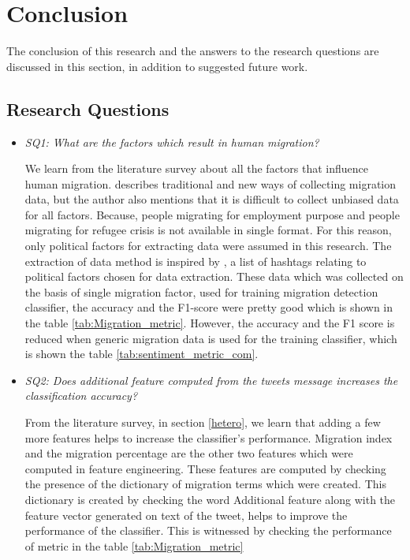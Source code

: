 \chapter{Conclusion}\label{chap:conclusion}

The conclusion of this research and the answers to the research questions are discussed in this section, in addition to suggested future work.

\section{Research Questions}


\begin{itemize}
    \item \textit{SQ1: What are the factors which result in human migration?}
    
    We learn from the literature survey about all the factors that influence human migration. \cite{Christina_Hughes_et_al.} describes traditional and new ways of collecting migration data, but the author also mentions that it is difficult to collect unbiased data for all factors. Because, people migrating for employment purpose and people migrating for refugee crisis is not available in single format. For this reason, only political factors for extracting data were assumed in this research. The extraction of data method is inspired by \cite{Cortis}, a list of hashtags relating to political factors chosen for data extraction. These data which was collected on the basis of single migration factor, used for training migration detection classifier, the accuracy and the F1-score were pretty good which is shown in the table \ref{tab:Migration_metric}. However, the accuracy and the F1 score is reduced when generic migration data is used for the training classifier, which is shown the table \ref{tab:sentiment_metric_com}.
    
    \item \textit{SQ2: Does additional feature computed from the tweets message increases the classification accuracy?}
    
  
    
    From the literature survey, in section \ref{hetero}, we learn that adding a few more features helps to increase the classifier's performance. Migration index and the migration percentage are the other two features which were computed in feature engineering. These features are computed by checking the presence of the dictionary of migration terms which were created. This dictionary is created by checking the word Additional feature along with the feature vector generated on text of the tweet, helps to improve the performance of the classifier. This is witnessed by checking the performance of metric in the table \ref{tab:Migration_metric}

\end{itemize}


